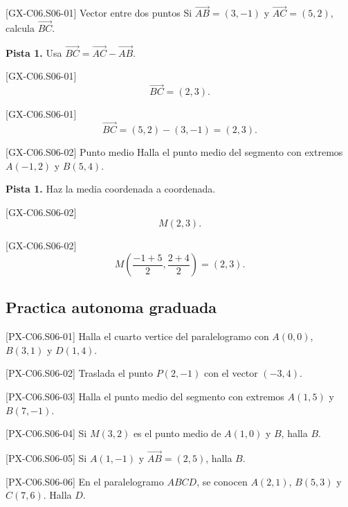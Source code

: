 \begin{guidedexercise}{[GX-C06.S06-01] Vector entre dos puntos}
Si \(\overrightarrow{AB}=(3,-1)\) y \(\overrightarrow{AC}=(5,2)\), calcula
\(\overrightarrow{BC}\).

\textbf{Pista 1.} Usa \(\overrightarrow{BC}=\overrightarrow{AC}-\overrightarrow{AB}\).
\end{guidedexercise}

\begin{shortanswer}{[GX-C06.S06-01]}
\[
\overrightarrow{BC}=(2,3).
\]
\end{shortanswer}

\begin{fullsolution}{[GX-C06.S06-01]}
\[
\overrightarrow{BC}=(5,2)-(3,-1)=(2,3).
\]
\end{fullsolution}

\begin{guidedexercise}{[GX-C06.S06-02] Punto medio}
Halla el punto medio del segmento con extremos \(A(-1,2)\) y \(B(5,4)\).

\textbf{Pista 1.} Haz la media coordenada a coordenada.
\end{guidedexercise}

\begin{shortanswer}{[GX-C06.S06-02]}
\[
M(2,3).
\]
\end{shortanswer}

\begin{fullsolution}{[GX-C06.S06-02]}
\[
M\left(\frac{-1+5}{2},\frac{2+4}{2}\right)=(2,3).
\]
\end{fullsolution}

\subsection*{Practica autonoma graduada}
\begin{exercise}{[PX-C06.S06-01] Halla el cuarto vertice del paralelogramo con \(A(0,0)\), \(B(3,1)\) y \(D(1,4)\).}
\end{exercise}
\begin{exercise}{[PX-C06.S06-02] Traslada el punto \(P(2,-1)\) con el vector \((-3,4)\).}
\end{exercise}
\begin{exercise}{[PX-C06.S06-03] Halla el punto medio del segmento con extremos \(A(1,5)\) y \(B(7,-1)\).}
\end{exercise}
\begin{exercise}{[PX-C06.S06-04] Si \(M(3,2)\) es el punto medio de \(A(1,0)\) y \(B\), halla \(B\).}
\end{exercise}
\begin{exercise}{[PX-C06.S06-05] Si \(A(1,-1)\) y \(\overrightarrow{AB}=(2,5)\), halla \(B\).}
\end{exercise}
\begin{exercise}{[PX-C06.S06-06] En el paralelogramo \(ABCD\), se conocen \(A(2,1)\), \(B(5,3)\) y \(C(7,6)\). Halla \(D\).}
\end{exercise}

